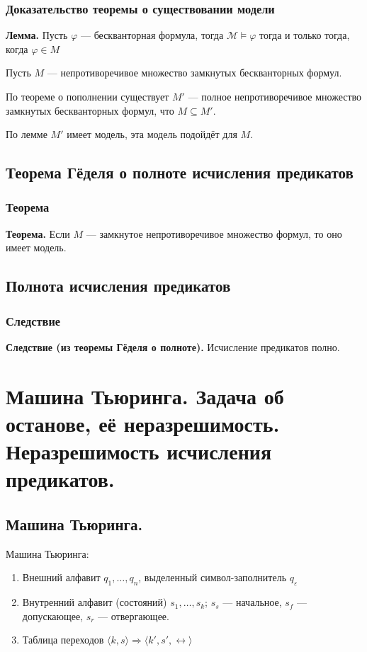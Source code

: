 \documentclass[10pt,a4paper,oneside]{article}
\begin{document}
\subsubsection{Доказательство теоремы о существовании модели}
{\bf Лемма.} Пусть $\varphi$ --- бескванторная формула, тогда $\mathcal{M}\models\varphi$ тогда и только тогда, когда $\varphi\in M$



Пусть $M$ --- непротиворечивое множество замкнутых бескванторных формул.

По теореме о пополнении существует $M'$ --- полное непротиворечивое множество замкнутых бескванторных формул,
что $M \subseteq M'$.

По лемме $M'$ имеет модель, эта модель подойдёт для $M$.

\subsection{Теорема Гёделя о полноте исчисления предикатов}
\subsubsection{Теорема}
{\bf Теорема.} Если $M$ --- замкнутое непротиворечивое множество формул, то оно имеет модель.

\subsection{Полнота исчисления предикатов}
\subsubsection{Следствие}
{\bf Следствие (из теоремы Гёделя о полноте).}
Исчисление предикатов полно.

\section{Машина Тьюринга. Задача об останове, её неразрешимость. Неразрешимость исчисления предикатов.}

\subsection{Машина Тьюринга.}
 Машина Тьюринга:
\begin{enumerate}
\item Внешний алфавит $q_1, \dots, q_n$, выделенный символ-заполнитель $q_\varepsilon$
\item Внутренний алфавит (состояний) $s_1, \dots, s_k$; $s_s$ --- начальное, $s_f$ --- допускающее, $s_r$ --- отвергающее.
\item Таблица переходов $\langle k, s \rangle \Rightarrow \langle k', s', \leftrightarrow \rangle$
\end{enumerate}
\end{document}
